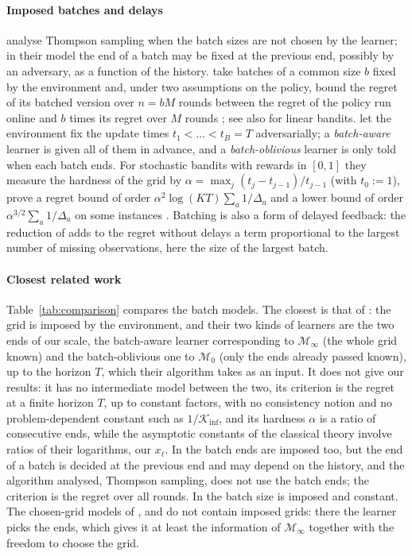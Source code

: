 \documentclass[11pt]{article}
\newcommand{\1}{\mathbf{1}}
\begin{document}
\paragraph{Imposed batches and delays} \citet{KO21b} analyse Thompson sampling when the batch sizes
are not chosen by the learner; in their model \citep[Section~II.A]{KO21b} the end of a batch may be
fixed at the previous end, possibly by an adversary, as a function of the history.
\citet{PGPK21} take batches of a common size $b$ fixed by the environment and, under two
assumptions on the policy, bound the regret of its batched version over $n=bM$ rounds between the
regret of the policy run online and $b$ times its regret over $M$ rounds
\citep[Theorem~3.1]{PGPK21}; see also \citet{PGPK22} for linear bandits.
\citet{QW26} let the environment fix the update times $t_1<\dots<t_B=T$
adversarially; a \emph{batch-aware} learner is given all of them in advance, and a
\emph{batch-oblivious} learner is only told when each batch ends. For stochastic bandits with
rewards in $[0,1]$ they measure the hardness of the grid by $\alpha=\max_j(t_j-t_{j-1})/t_{j-1}$
(with $t_0:=1$), prove a regret bound of order $\alpha^2\log(KT)\sum_a1/\Delta_a$ and a lower bound
of order $\alpha^{3/2}\sum_a1/\Delta_a$ on some instances \citep[Theorems~1 and~4]{QW26}. Batching is
also a form of delayed feedback: the reduction of \citet[Theorem~6]{JGS13} adds to the regret
without delays a term proportional to the largest number of missing observations, here the size
of the largest batch.

\paragraph{Closest related work} Table~\ref{tab:comparison} compares the batch models. The closest
is that of \citet{QW26}: the grid is imposed by the environment, and their two kinds of learners
are the two ends of our scale, the batch-aware learner corresponding to $\mathcal M_\infty$ (the
whole grid known) and the batch-oblivious one to $\mathcal M_0$ (only the ends already passed
known), up to the horizon $T$, which their algorithm takes as an input. It does not give our results: it has no intermediate model between the two, its criterion
is the regret at a finite horizon $T$, up to constant factors, with no consistency notion and no
problem-dependent constant such as $1/\mathcal K_{\inf}$, and its hardness $\alpha$ is a ratio of
consecutive ends, while the asymptotic constants of the classical theory involve ratios of their
logarithms, our $x_\ell$. In \citet{KO21b} the batch ends are imposed too, but the end of a batch is
decided at the previous end and may depend on the history, and the algorithm analysed, Thompson
sampling, does not use the batch ends; the criterion is the regret over all rounds. In
\citet{PGPK21} the batch size is imposed and constant. The chosen-grid models of \citet{PRCS16},
\citet{GHRZ19} and \citet{JTXHXG21} do not contain imposed grids: there the learner picks the ends,
which gives it at least the information of $\mathcal M_\infty$ together with the freedom to choose
the grid.
\end{document}
